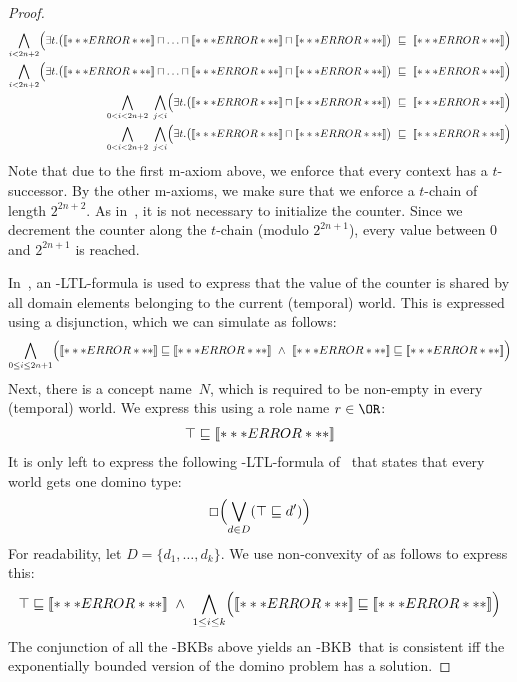 \begin{proof}
  \begin{align*}
    \bigwedge_{i<2n+2} \Bigl( \exists t.\bigl(\oax{Z_{0}(a)} \sqcap\ldots\sqcap \oax{Z_{i-1}(a)} \sqcap \oax{Z_{i}(a)}\bigr)
    & \ \sqsubseteq\ \oax{(\lnot Z_{i})(a)}\Bigr)\\ 
    \bigwedge_{i<2n+2}\Bigl( \exists t.\bigl(\oax{Z_{0}(a)}\sqcap\ldots\sqcap \oax{Z_{i-1}(a)} \sqcap \oax{(\lnot Z_{i})(a)}\bigr)
    & \ \sqsubseteq\ \oax{Z_{i}(a)}\Bigr)\\
    \bigwedge_{0<i<2n+2}\ \bigwedge_{j<i}\Bigl(\exists t.\bigl(\oax{(\lnot Z_{j})(a)}\sqcap\oax{Z_{i}(a)}\bigr)
    & \ \sqsubseteq\ \oax{Z_{i}(a)}\Bigr)\\
    \bigwedge_{0<i<2n+2}\ \bigwedge_{j<i}\Bigl(\exists t.\bigl(\oax{(\lnot Z_{j})(a)}\sqcap\oax{(\lnot Z_{i})(a)}\bigr)
    & \ \sqsubseteq\ \oax{(\lnot Z_{i})(a)}\Bigr)
  \end{align*}
  Note that due to the first m-axiom above, we enforce that every context has a $t$-successor.  By
  the other m-axioms, we make sure that we enforce a $t$-chain of length $2^{2n+2}$.
  As in~\cite{BaGL-KR08,BaGL-ToCL12}, it is not necessary to initialize the counter.  Since we
  decrement the counter along the $t$-chain (modulo $2^{2n+1}$), every value between $0$ and
  $2^{2n+1}$ is reached.

  In~\cite{BaGL-KR08,BaGL-ToCL12}, an \ALC-LTL-formula is used to express that the value of the
  counter is shared by all domain elements belonging to the current (temporal) world.  This is
  expressed using a disjunction, which we can simulate as follows:
  \begin{gather*}
    \bigwedge_{0\le i\le 2n+1} \Bigl(\oax{Z_i(a)}\sqsubseteq\oax{\top\sqsubseteq Z_i}\ \land\
    \oax{(\lnot Z_i)(a)}\sqsubseteq\oax{Z_i\sqsubseteq\bot}\Bigr)
  \end{gather*}
  Next, there is a concept name~$N$, which is required to be non-empty in every (temporal) world.  We
  express this using a role name $r\in\OR$:
  \begin{gather*}
    \top\sqsubseteq\oax{(\exists r.N)(a)}
  \end{gather*}
  It is only left to express the following \ALC-LTL-formula of~\cite{BaGL-KR08,BaGL-ToCL12} that
  states that every world gets one domino type:
  \begin{gather*}
    \Box\Bigl(\bigvee_{d\in D} (\top\sqsubseteq d')\Bigr)
  \end{gather*}
  For readability, let $D=\{d_1,\dots,d_k\}$.  We use non-convexity of \ALC as follows to express
  this:
  \begin{gather*}
    \top\sqsubseteq\oax{(d_1'\sqcup\dots\sqcup d_k')(a)}\ \land\ \bigwedge_{1\le i\le k}
    \Bigl(\oax{d_i'(a)}\sqsubseteq\oax{\top\sqsubseteq d_i'}\Bigr)
  \end{gather*}
  The conjunction of all the \ELALC-BKBs above yields an \ELALC-BKB~\Bmc that is consistent iff the
  exponentially bounded version of the domino problem has a solution.
\end{proof}

